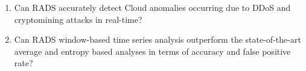 \begin{enumerate}[{(1)}]
\item Can RADS accurately detect Cloud anomalies occurring due to DDoS and cryptomining attacks in real-time? 
\item Can RADS window-based time series analysis outperform the state-of-the-art average and entropy based analyses in terms of accuracy and false positive rate? 

\end{enumerate}
